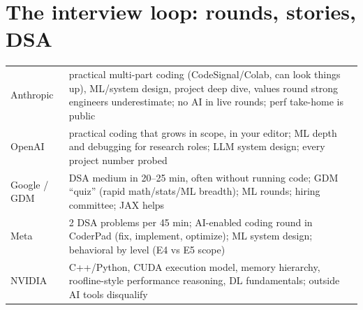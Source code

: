 \section{The interview loop: rounds, stories, DSA}

\begin{center}
\end{center}

\begin{mem}
\begin{tabularx}{\linewidth}{@{}lL@{}}
\toprule
Anthropic & practical multi-part coding (CodeSignal/Colab, can look things up), ML/system design, project deep dive, values round strong engineers underestimate; no AI in live rounds; perf take-home is public\\
OpenAI & practical coding that grows in scope, in your editor; ML depth and debugging for research roles; LLM system design; every project number probed\\
Google / GDM & DSA medium in 20--25 min, often without running code; GDM ``quiz'' (rapid math/stats/ML breadth); ML rounds; hiring committee; JAX helps\\
Meta & 2 DSA problems per 45 min; AI-enabled coding round in CoderPad (fix, implement, optimize); ML system design; behavioral by level (E4 vs E5 scope)\\
NVIDIA & C++/Python, CUDA execution model, memory hierarchy, roofline-style performance reasoning, DL fundamentals; outside AI tools disqualify\\\bottomrule
\end{tabularx}
\end{mem}

